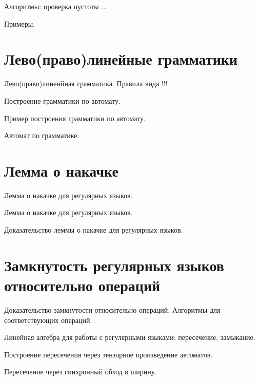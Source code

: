 Алгоритмы: проверка пустоты ... 

Примеры.



\section{Лево(право)линейные грамматики}

\begin{definition}
    Лево(право)линенйная грамматика. Правила вида  !!!
\end{definition}

Построение грамматики по автомату.

Пример построения грамматики по автомату.

Автомат по грамматике. 

\section{Лемма о накачке}

Лемма о накачке для регулярных языков.

\begin{lemma}
    Лемма о накачке для регулярных языков.
\end{lemma}

Доказательство леммы о накачке для регулярных языков.

\section{Замкнутость регулярных языков относительно операций}

Доказательство замкнутости относительно операций. Алгоритмы для соответствующих операций.

Линейная алгебра для работы с регулярными языками: пересечение, замыкание.

Построение пересечения через тензорное произведение автоматов.

Пересечение через синхронный обход в ширину.

%
%
